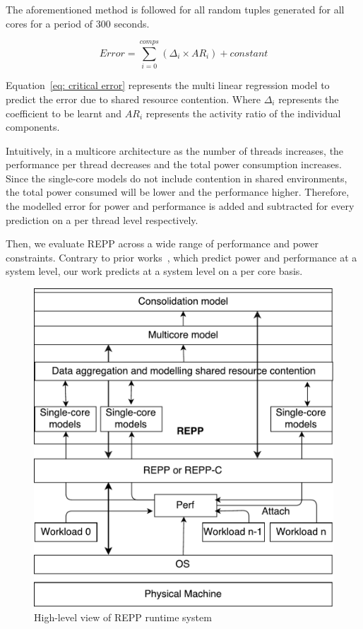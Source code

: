 The aforementioned method is followed for all random tuples generated for all cores for a
period of 300 seconds. 

\begin{equation}%
    \label{eq: critical error}
     Error = \sum_{i=0}^{comps}(\Delta_{\mathit{i}} \times AR_{\mathit{i}}) + constant
\end{equation}

Equation~\ref{eq: critical error} represents the multi linear regression model to predict
the error due to shared resource contention. Where $\Delta_{\mathit{i}}$ represents the
coefficient to be learnt and $AR_{\mathit{i}}$ represents the activity ratio of the
individual components. 

Intuitively, in a multicore architecture as the number of threads increases, the
performance per thread decreases and the total power consumption increases. Since the
single-core models do not include contention in shared environments, the total power
consumed will be lower and the performance higher. Therefore, the modelled error for power
and performance is added and subtracted for every prediction on a per thread level
respectively.

    
Then, we evaluate REPP across a wide range of performance and power constraints.  Contrary
to prior works~\citep{Su:2014:POP:2742155.2742200, Cochran:2011:PCA:2155620.2155641,
Singh:2009:RTP:1577129.1577137, Miftakhutdinov:2012:PPI:2457472.2457493, 
Srinivasan:2011:EIO:1945023.1945032}, which predict power and performance at a system
level, our work predicts at a system level on a per core basis.

\begin{figure}[t]
    \centering
    \includegraphics[scale=0.7]{Chapter3/Figs/repp-arch/REPP.pdf}
    \caption{High-level view of REPP runtime system} 
    \label{fig: archrepp} 
\end{figure}


